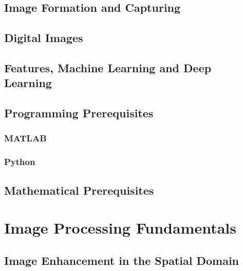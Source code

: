 \section{Image Formation and Capturing} 
\label{booksection_8_Image_Formation_and_Capturing}

\section{Digital Images} 
\label{booksection_9_Digital_Images}

\section{Features, Machine Learning and Deep Learning} 
\label{booksection_10_Features_Machine_Learning_and_Deep_Learning}

\section{Programming Prerequisites} 
\label{booksection_11_Programming_Prerequisites}
\subsection{MATLAB} 
\label{booksection_12_MATLAB}

\subsection{Python} 
\label{booksection_13_Python}

\section{Mathematical Prerequisites} 
\label{booksection_14_Mathematical_Prerequisites}

\chapter{Image Processing Fundamentals} 
\label{booksection_15_Image_Processing_Fundamentals}
\section{Image Enhancement in the Spatial Domain} 
\label{booksection_16_Image_Enhancement_in_the_Spatial_Domain}
